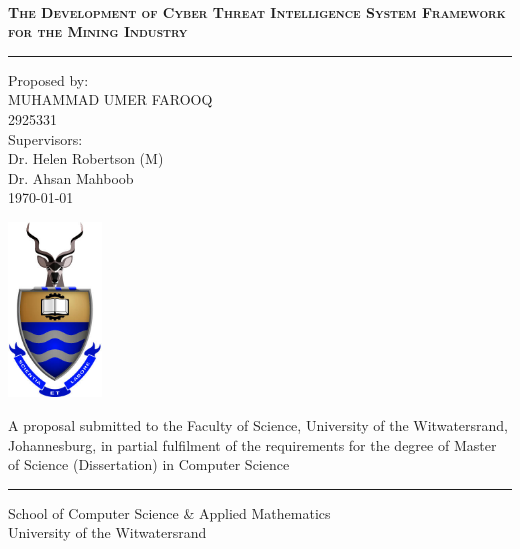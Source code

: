 \documentclass[a4paper,twoside,12pt]{report}
\begin{document}
\onecolumn
\thispagestyle{empty}

\setcounter{page}{0}
\ 
\begin{center}
  \vfill
  {
  \huge \bf \textsc{The Development of Cyber Threat Intelligence System Framework for the Mining Industry}\\
  \rule{\linewidth}{0.5pt}



  \normalsize
  Proposed by:\\
  MUHAMMAD UMER FAROOQ\\
  2925331\\[20pt]
  Supervisors:\\[10pt]
  Dr. Helen Robertson (M)\\[10pt]
  Dr. Ahsan Mahboob\\[10pt]
  \today
  }
  \vfill

  \vfill
  \includegraphics[width=2.5cm]{images/wits.png}
  \vfill
  \vfill

  \small{A proposal submitted to the Faculty of Science, University of the Witwatersrand, Johannesburg,
in partial fulfilment of the requirements for the degree of Master of Science (Dissertation) in Computer Science}\\
\rule{\linewidth}{0.5pt}
\large School of Computer Science \& Applied Mathematics\\
\large University of the Witwatersrand\\[20pt]

\end{center}
\vfill
\newpage

\pagestyle{plain}
\setcounter{page}{1}
\end{document}
